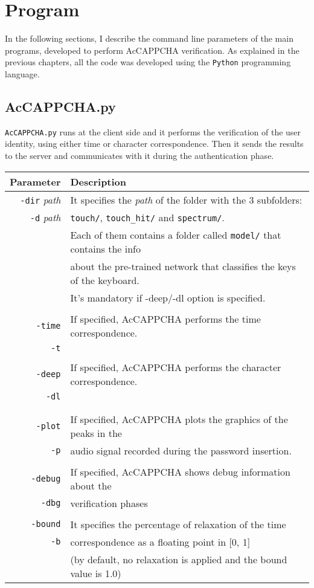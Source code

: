 \chapter{Program}\label{appendix:Program}
In the following sections, I describe the command line parameters of the main programs, developed to perform AcCAPPCHA verification. As explained in the previous chapters, all the code was developed using the \texttt{Python} programming language.

\section{AcCAPPCHA.py}
\texttt{AcCAPPCHA.py} runs at the client side and it performs the verification of the user identity, using either time or character correspondence. Then it sends the results to the server and communicates with it during the authentication phase.

{\footnotesize
\begin{longtable}{rl}
\hline
\textbf{Parameter} & \textbf{Description}\\
\hline
\texttt{-dir} \textit{path} & It specifies the \textit{path} of the folder with the 3 subfolders:\\
\texttt{-d} \textit{path} & \texttt{touch/}, \texttt{touch\_hit/} and \texttt{spectrum/}.\\
& Each of them contains a folder called \texttt{model/} that contains the info\\
& about the pre-trained network that classifies the keys of the keyboard.\\
& It's mandatory if -deep/-dl option is specified.\\
&\\
\texttt{-time} & If specified, AcCAPPCHA performs the time correspondence.\\
\texttt{-t} & \\
&\\
\texttt{-deep} & If specified, AcCAPPCHA performs the character correspondence.\\
\texttt{-dl} & \\
&\\
&\\
\texttt{-plot} & If specified, AcCAPPCHA plots the graphics of the peaks in the\\
\texttt{-p} & audio signal recorded during the password insertion.\\
&\\
\texttt{-debug} & If specified, AcCAPPCHA shows debug information about the\\
\texttt{-dbg} & verification phases\\
&\\
\texttt{-bound} & It specifies the percentage of relaxation of the time\\
\texttt{-b} & correspondence as a floating point in [0, 1]\\
& (by default, no relaxation is applied and the bound value is 1.0)\\
\hline
\end{longtable}}

